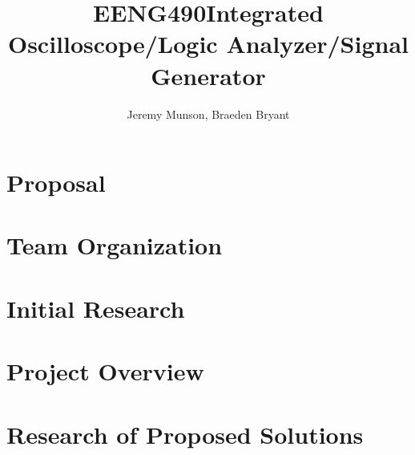 \documentclass[11pt]{article}
\title{EENG490\linebreak \linebreak Integrated Oscilloscope/Logic Analyzer/Signal Generator}
\author{Jeremy Munson, Braeden Bryant}
\begin{document}
	
	
	
	

	\section{Proposal}
	
	
	
	
	
	
	

	\section{Team Organization}
	
	

	\section{Initial Research}
	
	

	\section{Project Overview}
	
	
	
	

	\section{Research of Proposed Solutions}
	
	
	
	
	
	
	
\end{document}
